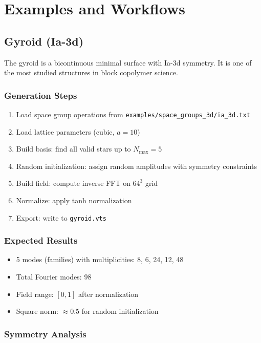 \chapter{Examples and Workflows}

\section{Gyroid (Ia-3d)}

The gyroid is a bicontinuous minimal surface with Ia-3d symmetry. It is one of the most studied structures in block copolymer science.

\subsection{Generation Steps}

\begin{enumerate}
    \item Load space group operations from \texttt{examples/space\_groups\_3d/ia\_3d.txt}
    \item Load lattice parameters (cubic, $a = 10$)
    \item Build basis: find all valid stars up to $N_{\text{max}} = 5$
    \item Random initialization: assign random amplitudes with symmetry constraints
    \item Build field: compute inverse FFT on $64^3$ grid
    \item Normalize: apply tanh normalization
    \item Export: write to \texttt{gyroid.vts}
\end{enumerate}

\subsection{Expected Results}

\begin{itemize}
    \item 5 modes (families) with multiplicities: 8, 6, 24, 12, 48
    \item Total Fourier modes: 98
    \item Field range: $[0, 1]$ after normalization
    \item Square norm: $\approx 0.5$ for random initialization
\end{itemize}

\subsection{Symmetry Analysis}

